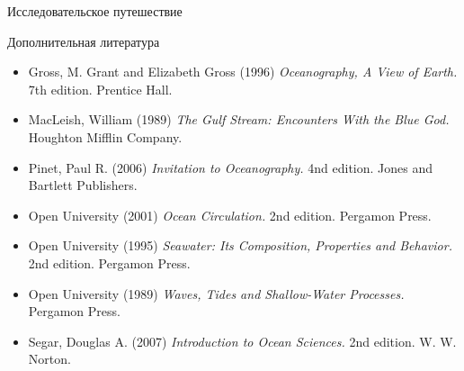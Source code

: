 \begin{chapter}{Исследовательское путешествие}
\begin{section}{Дополнительная литература}
\begin{itemize}
\item
Gross, M. Grant and Elizabeth Gross (1996) \textit{Oceanography, 
A View of Earth.} 7th edition. Prentice Hall.
%

\item
MacLeish, William (1989) \textit{The Gulf Stream: Encounters With the Blue God.}
Houghton Mifflin Company. 
%

\item
Pinet, Paul R. (2006) \textit{Invitation to Oceanography.} 4nd edition.
Jones and Bartlett Publishers.
%

\item
Open University (2001) \textit{Ocean Circulation.} 2nd edition. Pergamon Press.
%

\item
Open University (1995) \textit{Seawater: Its Composition, Properties 
and Behavior.} 2nd edition. Pergamon Press.
%

\item
Open University (1989) \textit{Waves, Tides and Shallow-Water Processes.} 
Pergamon Press. 
%

\item
Segar, Douglas A. (2007) \textit{Introduction to Ocean Sciences.}
2nd edition. W. W. Norton.
%
\end{itemize}
\end{section}

\end{chapter}
